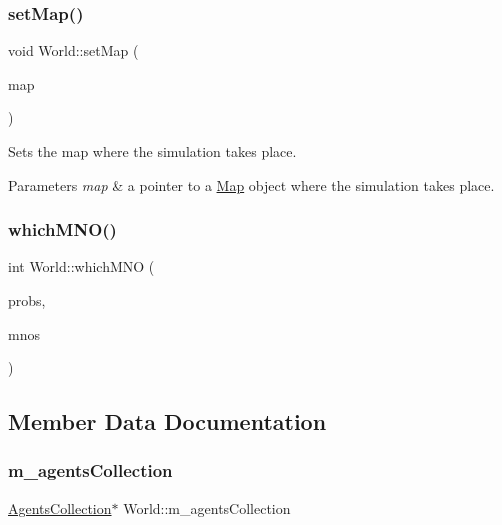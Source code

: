 \subsubsection{\texorpdfstring{setMap()}{setMap()}}
{\footnotesize\ttfamily void World\+::set\+Map (\begin{DoxyParamCaption}\item[{\mbox{\hyperlink{class_map}{Map}} $\ast$}]{map }\end{DoxyParamCaption})}

Sets the map where the simulation takes place. 
\begin{DoxyParams}{Parameters}
{\em map} & a pointer to a \mbox{\hyperlink{class_map}{Map}} object where the simulation takes place. \\
\hline
\end{DoxyParams}
\mbox{\label{class_world_adf473b1600b41a11c7ef1f0251abb5b7}} 
\subsubsection{\texorpdfstring{whichMNO()}{whichMNO()}}
{\footnotesize\ttfamily int World\+::which\+M\+NO (\begin{DoxyParamCaption}\item[{vector$<$ pair$<$ string, double $>$$>$}]{probs,  }\item[{vector$<$ \mbox{\hyperlink{class_mobile_operator}{Mobile\+Operator}} $\ast$ $>$}]{mnos }\end{DoxyParamCaption})\hspace{0.3cm}{\ttfamily [private]}}



\subsection{Member Data Documentation}
\mbox{\label{class_world_ae1262689381f00828c0a639b7cbb52a3}} 
\subsubsection{\texorpdfstring{m\_agentsCollection}{m\_agentsCollection}}
{\footnotesize\ttfamily \mbox{\hyperlink{class_agents_collection}{Agents\+Collection}}$\ast$ World\+::m\+\_\+agents\+Collection\hspace{0.3cm}{\ttfamily [private]}}

